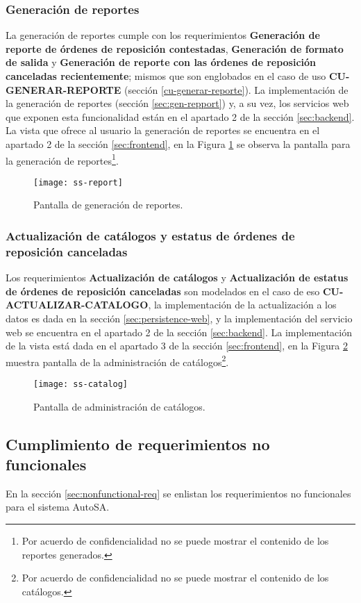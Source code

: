 \subsubsection{Generación de reportes}
La generación de reportes cumple con los requerimientos \textbf{Generación de reporte de órdenes de reposición contestadas}, \textbf{Generación de formato de salida} y \textbf{Generación de reporte con las órdenes de reposición canceladas recientemente}; mismos que son englobados en el caso de uso \textbf{CU-GENERAR-REPORTE} (sección \ref{cu-generar-reporte}). La implementación de la generación de reportes (sección \ref{sec:gen-repport}) y, a su vez, los servicios web que exponen esta funcionalidad están en el apartado 2 de la sección \ref{sec:backend}. La vista que ofrece al usuario la generación de reportes se encuentra en el apartado 2 de la sección \ref{sec:frontend}, en la Figura \ref{fig:ss-report} se observa la pantalla para la generación de reportes\footnote{Por acuerdo de confidencialidad no se puede mostrar el contenido de los reportes generados.}. 
	\begin{figure}[h]
		\centering
		\texttt{[image: ss-report]}
		\caption{Pantalla de generación de reportes.}
		\label{fig:ss-report}
	\end{figure}

\subsubsection{Actualización de catálogos y estatus de órdenes de reposición canceladas}
Los requerimientos \textbf{Actualización de catálogos} y \textbf{Actualización de estatus de órdenes de reposición canceladas} son modelados en el caso de eso \textbf{CU-ACTUALIZAR-CATALOGO}, la implementación de la actualización a los datos es dada en la sección \ref{sec:persistence-web}, y la implementación del servicio web se encuentra en el apartado 2 de la sección \ref{sec:backend}. La implementación de la vista está dada en el apartado 3 de la sección \ref{sec:frontend}, en la Figura \ref{fig:ss-catalog} muestra pantalla de la administración de catálogos\footnote{Por acuerdo de confidencialidad no se puede mostrar el contenido de los catálogos.}.
\begin{figure}[h]
	\centering
	\texttt{[image: ss-catalog]}
	\caption{Pantalla de administración de catálogos.}
	\label{fig:ss-catalog}
\end{figure}


\subsection{Cumplimiento de requerimientos no funcionales}
En la sección \ref{sec:nonfunctional-req} se enlistan los requerimientos no funcionales para el sistema AutoSA.

